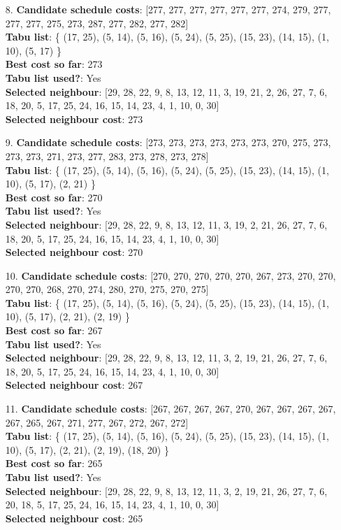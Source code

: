 \documentclass[fleqn]{article}
\begin{document}
\begin{itemize}
    \item[8.] \textbf{Candidate schedule costs}: [277, 277, 277, 277, 277, 277, 274, 279, 277, 277, 277, 275, 273, 287, 277, 282, 277, 282] \\
    \textbf{Tabu list}: \{ (17, 25), (5, 14), (5, 16), (5, 24), (5, 25), (15, 23), (14, 15), (1, 10), (5, 17) \} \\
    \textbf{Best cost so far}: 273 \\
    \textbf{Tabu list used?}: Yes \\
    \textbf{Selected neighbour}: [29, 28, 22, 9, 8, 13, 12, 11, 3, 19, 21, 2, 26, 27, 7, 6, 18, 20, 5, 17, 25, 24, 16, 15, 14, 23, 4, 1, 10, 0, 30] \\
    \textbf{Selected neighbour cost}: 273
      

    \item[9.] \textbf{Candidate schedule costs}: [273, 273, 273, 273, 273, 273, 270, 275, 273, 273, 273, 271, 273, 277, 283, 273, 278, 273, 278] \\
    \textbf{Tabu list}: \{ (17, 25), (5, 14), (5, 16), (5, 24), (5, 25), (15, 23), (14, 15), (1, 10), (5, 17), (2, 21) \} \\
    \textbf{Best cost so far}: 270 \\
    \textbf{Tabu list used?}: Yes \\
    \textbf{Selected neighbour}: [29, 28, 22, 9, 8, 13, 12, 11, 3, 19, 2, 21, 26, 27, 7, 6, 18, 20, 5, 17, 25, 24, 16, 15, 14, 23, 4, 1, 10, 0, 30] \\
    \textbf{Selected neighbour cost}: 270
      

    \item[10.] \textbf{Candidate schedule costs}: [270, 270, 270, 270, 270, 267, 273, 270, 270, 270, 270, 268, 270, 274, 280, 270, 275, 270, 275] \\
    \textbf{Tabu list}: \{ (17, 25), (5, 14), (5, 16), (5, 24), (5, 25), (15, 23), (14, 15), (1, 10), (5, 17), (2, 21), (2, 19) \} \\
    \textbf{Best cost so far}: 267 \\
    \textbf{Tabu list used?}: Yes \\
    \textbf{Selected neighbour}: [29, 28, 22, 9, 8, 13, 12, 11, 3, 2, 19, 21, 26, 27, 7, 6, 18, 20, 5, 17, 25, 24, 16, 15, 14, 23, 4, 1, 10, 0, 30] \\
    \textbf{Selected neighbour cost}: 267
      

    \item[11.] \textbf{Candidate schedule costs}: [267, 267, 267, 267, 270, 267, 267, 267, 267, 267, 265, 267, 271, 277, 267, 272, 267, 272] \\
    \textbf{Tabu list}: \{ (17, 25), (5, 14), (5, 16), (5, 24), (5, 25), (15, 23), (14, 15), (1, 10), (5, 17), (2, 21), (2, 19), (18, 20) \} \\
    \textbf{Best cost so far}: 265 \\
    \textbf{Tabu list used?}: Yes \\
    \textbf{Selected neighbour}: [29, 28, 22, 9, 8, 13, 12, 11, 3, 2, 19, 21, 26, 27, 7, 6, 20, 18, 5, 17, 25, 24, 16, 15, 14, 23, 4, 1, 10, 0, 30] \\
    \textbf{Selected neighbour cost}: 265
      


\end{itemize}
\end{document}
